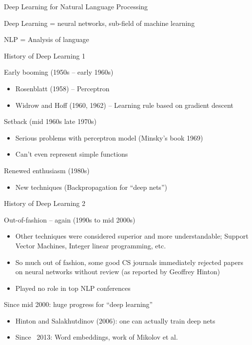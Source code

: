 \documentclass[12pt]{beamer}
\begin{document}
\begin{frame}{Deep Learning for Natural Language Processing}
	
	
Deep Learning = neural networks, sub-field of machine learning

NLP = Analysis of language
	
\end{frame}

\begin{frame}{History of Deep Learning 1}

Early booming (1950s -- early 1960s)

\begin{itemize}
	\item Rosenblatt (1958) -- Perceptron
	\item Widrow and Hoff (1960, 1962) --  Learning rule based on gradient descent
\end{itemize}

Setback (mid 1960s late 1970s)

\begin{itemize}
	\item Serious problems with perceptron model (Minsky’s book 1969)
	\item Can’t even represent simple functions
\end{itemize}


Renewed enthusiasm (1980s)

\begin{itemize}
	\item New techniques (Backpropagation for “deep nets”)
\end{itemize}

\end{frame}


\begin{frame}{History of Deep Learning 2}
	
Out-of-fashion -- again (1990s to mid 2000s)

\begin{itemize}
	\item Other techniques were considered superior and more understandable; Support Vector Machines, Integer linear programming, etc.
	\item So much out of fashion, some good CS journals immediately rejected papers on neural networks without review (as reported by Geoffrey Hinton)
	\item Played no role in top NLP conferences
\end{itemize}

Since mid 2000: huge progress for “deep learning”

\begin{itemize}
	\item Hinton and Salakhutdinov (2006): one can actually train deep nets
	\item Since ~2013: Word embeddings, work of Mikolov et al. 
\end{itemize}

\end{frame}
\end{document}
